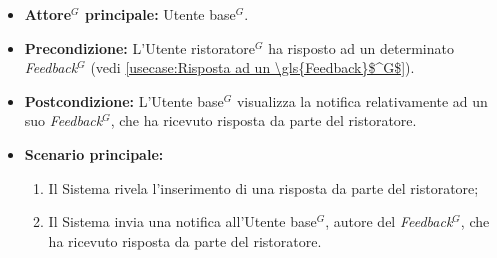 \label{usecase:Visualizzazione notifica risposta \gls{Feedback}$^G$}
\begin{itemize}
	\item \textbf{\gls{Attore}$^G$ principale:} \gls{Utente base}$^G$.

	\item \textbf{Precondizione:} L'\gls{Utente ristoratore}$^G$ ha risposto ad un determinato \textit{\gls{Feedback}$^G$} (vedi \autoref{usecase:Risposta ad un \gls{Feedback}$^G$}).


	\item \textbf{Postcondizione:} L'\gls{Utente base}$^G$ visualizza la notifica relativamente ad un suo \textit{\gls{Feedback}$^G$}, che ha ricevuto risposta da parte del ristoratore.

	\item \textbf{Scenario principale:}
	      \begin{enumerate}
		      \item Il Sistema rivela l'inserimento di una risposta da parte del ristoratore;

		      \item Il Sistema invia una notifica all'\gls{Utente base}$^G$, autore del \textit{\gls{Feedback}$^G$}, che ha ricevuto risposta da parte del ristoratore.
	      \end{enumerate}
\end{itemize}
